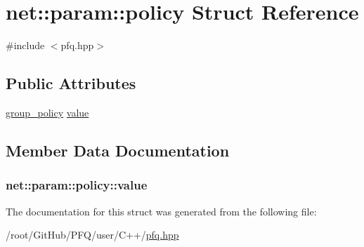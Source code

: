 \hypertarget{structnet_1_1param_1_1policy}{\section{net\-:\-:param\-:\-:policy Struct Reference}
\label{structnet_1_1param_1_1policy}
}


{\ttfamily \#include $<$pfq.\-hpp$>$}

\subsection*{Public Attributes}
\begin{DoxyCompactItemize}
\item 
\hyperlink{namespacenet_aedc1a0dde937ddbd0800af02920b1067}{group\-\_\-policy} \hyperlink{structnet_1_1param_1_1policy_abc94abaa3c703a34753cd42f435d03f6}{value}
\end{DoxyCompactItemize}


\subsection{Member Data Documentation}
\hypertarget{structnet_1_1param_1_1policy_abc94abaa3c703a34753cd42f435d03f6}{
\subsubsection[{value}]{ net\-::param\-::policy\-::value}}\label{structnet_1_1param_1_1policy_abc94abaa3c703a34753cd42f435d03f6}


The documentation for this struct was generated from the following file\-:\begin{DoxyCompactItemize}
\item 
/root/\-Git\-Hub/\-P\-F\-Q/user/\-C++/\hyperlink{pfq_8hpp}{pfq.\-hpp}\end{DoxyCompactItemize}
